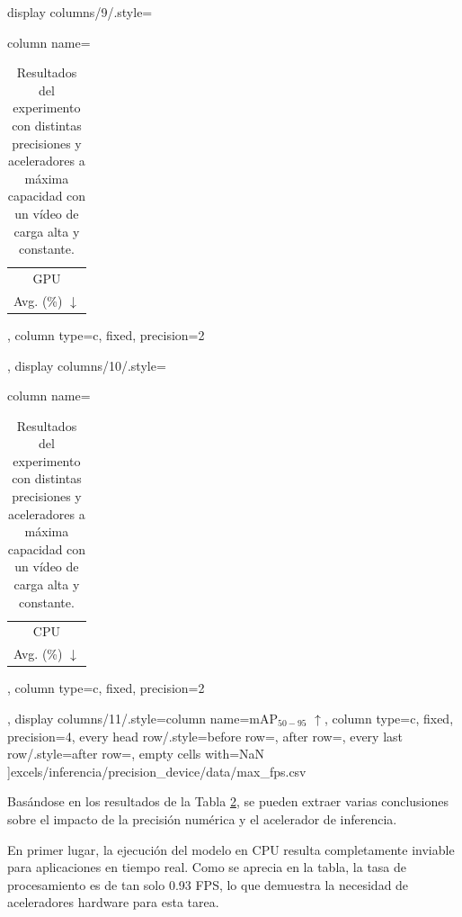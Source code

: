 \documentclass[11pt,spanish,listoffigures,listoftables]{tfgetsinf}
\begin{document}
\begin{table}[H]
{      display columns/9/.style={column name=\begin{tabular}[c]{@{}c@{}}GPU\\Avg. (\%) $\downarrow$\end{tabular}, column type={c}, fixed, precision=2},
      display columns/10/.style={column name=\begin{tabular}[c]{@{}c@{}}CPU\\Avg. (\%) $\downarrow$\end{tabular}, column type={c}, fixed, precision=2},
      display columns/11/.style={column name={mAP$_{50-95}$ $\uparrow$}, column type={c}, fixed, precision=4},
       every head row/.style={before row=\toprule, after row=\midrule},
       every last row/.style={after row=\bottomrule},
       empty cells with={NaN}
   ]{excels/inferencia/precision_device/data/max_fps.csv}
   }
   \caption[Resultados del experimento con distintas precisiones y aceleradores a máxima capacidad con un vídeo de carga alta y constante]{Resultados del experimento con distintas precisiones y aceleradores a máxima capacidad con un vídeo de carga alta y constante.}
   \label{tab:experimento_precision_dispositivo_max_fps_carga_alta_constante}
\end{table}

Basándose en los resultados de la Tabla \ref{tab:experimento_precision_dispositivo_max_fps_carga_alta_constante}, se pueden extraer varias conclusiones sobre el impacto de la precisión numérica y el acelerador de inferencia.

En primer lugar, la ejecución del modelo en CPU resulta completamente inviable para aplicaciones en tiempo real. Como se aprecia en la tabla, la tasa de procesamiento es de tan solo 0.93 FPS, lo que demuestra la necesidad de aceleradores hardware para esta tarea.
\end{document}

